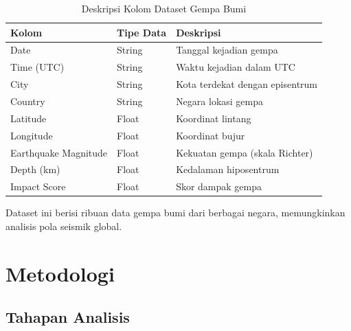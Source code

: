 \documentclass[12pt,a4paper]{article}
\begin{document}
\begin{table}[H]
\centering
\caption{Deskripsi Kolom Dataset Gempa Bumi}
\begin{tabular}{|l|l|l|}
\hline
\textbf{Kolom} & \textbf{Tipe Data} & \textbf{Deskripsi} \\
\hline
Date & String & Tanggal kejadian gempa \\
Time (UTC) & String & Waktu kejadian dalam UTC \\
City & String & Kota terdekat dengan episentrum \\
Country & String & Negara lokasi gempa \\
Latitude & Float & Koordinat lintang \\
Longitude & Float & Koordinat bujur \\
Earthquake Magnitude & Float & Kekuatan gempa (skala Richter) \\
Depth (km) & Float & Kedalaman hiposentrum \\
Impact Score & Float & Skor dampak gempa \\
\hline
\end{tabular}
\end{table}

Dataset ini berisi ribuan data gempa bumi dari berbagai negara, memungkinkan analisis pola seismik global.

\section{Metodologi}

\subsection{Tahapan Analisis}
\end{document}
